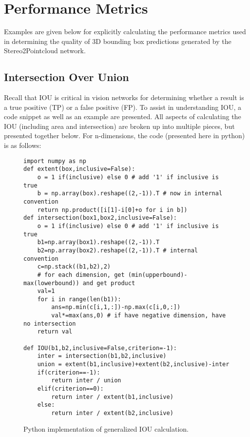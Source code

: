 \section{Performance Metrics}
\label{appendix_metrics}

Examples are given below for explicitly calculating the performance metrics used in determining the quality of 3D bounding box predictions generated by the Stereo2Pointcloud network.

\subsection{Intersection Over Union}
Recall that IOU is critical in vision networks for determining whether a result is a true positive (TP) or a false positive (FP). To assist in understanding IOU, a code snippet as well as an example are presented. All aspects of calculating the IOU (including area and intersection) are broken up into multiple pieces, but presented together below. For n-dimensions, the code (presented here in python) is as follows:

\begin{figure}[ht]
\begin{lstlisting}
import numpy as np
def extent(box,inclusive=False):
    o = 1 if(inclusive) else 0 # add '1' if inclusive is true
    b = np.array(box).reshape((2,-1)).T # now in internal convention
    return np.product([i[1]-i[0]+o for i in b])
def intersection(box1,box2,inclusive=False):
    o = 1 if(inclusive) else 0 # add '1' if inclusive is true
    b1=np.array(box1).reshape((2,-1)).T
    b2=np.array(box2).reshape((2,-1)).T # internal convention
    c=np.stack((b1,b2),2)
    # for each dimension, get (min(upperbound)-max(lowerbound)) and get product
    val=1
    for i in range(len(b1)):
        ans=np.min(c[i,1,:])-np.max(c[i,0,:])
        val*=max(ans,0) # if have negative dimension, have no intersection
    return val

def IOU(b1,b2,inclusive=False,criterion=-1):
    inter = intersection(b1,b2,inclusive)
    union = extent(b1,inclusive)+extent(b2,inclusive)-inter
    if(criterion==-1):
        return inter / union
    elif(criterion==0):
        return inter / extent(b1,inclusive)
    else:
        return inter / extent(b2,inclusive)

\end{lstlisting}
\onehalfspacing %
\caption{Python implementation of generalized IOU calculation.}
\label{code_iou}
\end{figure}

